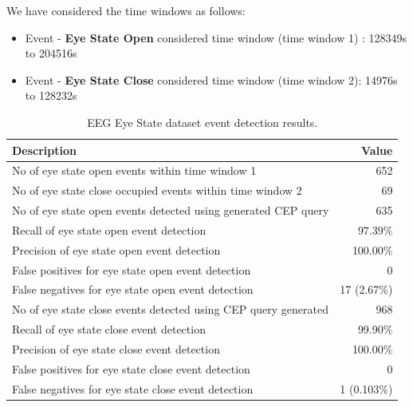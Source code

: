 \documentclass[conference]{IEEEtran}  %
\begin{document}
We have considered the time windows as follows:
\begin{itemize}
\item Event - \textbf{Eye State Open} considered time window (time window 1) : 128349s to 204516s
\item Event - \textbf{Eye State Close} considered time window (time window 2):
14976s to 128232s
\end{itemize}

\begin{table}
\caption{EEG Eye State dataset event detection results.}
\begin{center}
\begin{tabular}{ | m{6cm} | m{2.3cm}| } 
 \hline 
\textbf{Description} & \multicolumn{1}{|r|}{\textbf{Value}}\\
\hline
No of eye state open events within time window 1 & \multicolumn{1}{|r|}{652}\\
\hline
No of eye state close occupied events within time window 2 & \multicolumn{1}{|r|}{69}\\
\hline
No of eye state open events detected using generated CEP query & \multicolumn{1}{|r|}{635}\\
\hline
Recall of eye state open event detection & \multicolumn{1}{|r|}{97.39\%}\\
\hline
Precision of eye state open event detection & \multicolumn{1}{|r|}{100.00\%}\\
\hline
False positives for eye state open event detection & \multicolumn{1}{|r|}{0}\\
\hline
False negatives for eye state open event detection & \multicolumn{1}{|r|}{17 (2.67\%)}\\
\hline
No of eye state close events detected using CEP query generated & \multicolumn{1}{|r|}{968}\\
\hline
Recall of eye state close event detection & \multicolumn{1}{|r|}{99.90\%}\\
\hline
Precision of eye state close event detection & \multicolumn{1}{|r|}{100.00\%}\\
\hline
False positives for eye state close event detection & \multicolumn{1}{|r|}{0}\\
\hline
False negatives for eye state close event detection & \multicolumn{1}{|r|}{1 (0.103\%)}\\
\hline

\end{tabular}
\end{center}
\end{table}
\end{document}
